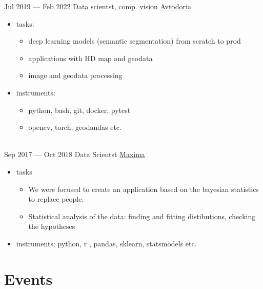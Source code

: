 \documentclass[letterpaper]{twentysecondcv} %
\begin{document}
\begin{twenty}
        \twentyitem
        {Jul 2019 —}
        {Feb 2022}
        {Data scientst, comp. vision}
        {  \href{https://avtodoria.ru/}{Avtodoria}}
        {}
        {
        {\begin{itemize}
            \item tasks:
            {\begin{itemize}
                \item deep learning models (semantic segmentation) from scratch to prod
                \item applications with HD map and geodata
                \item image and geodata processing
            \end{itemize}}
            \item instruments:
            {\begin{itemize}
                \item python, bash, git, docker, pytest
                \item opencv, torch, geodandas etc.
            \end{itemize}
            }
        \end{itemize}}
        }
        \\
        \twentyitem
        {Sep 2017 —}
        {Oct 2018}
        {Data Scientst}
        {\href{http://maxima.life/}{Maxima}}
        {}
        {
        {\begin{itemize}
            \item tasks
                {\begin{itemize}
                    \item We were focused to create an application based on the bayesian statistics to replace people.
                    \item Statistical analysis of the data: finding and fitting distibutions, checking the hypotheses
                \end{itemize}
                }
            \item instruments: python, r , pandas, sklearn, statsmodels etc.
        \end{itemize}}
        }
\end{twenty}


\section{Events}
\end{document}
